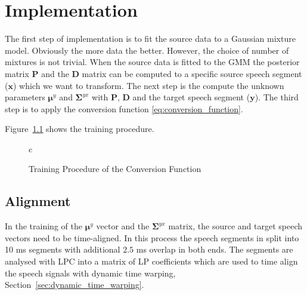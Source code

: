 \chapter{Implementation} %
\label{cha:implementation}
The first step of implementation is to fit the source data to a Gaussian mixture model. Obviously the more data the better. However, the choice of number of mixtures is not trivial. When the source data is fitted to the GMM the posterior matrix $\mathbf{P}$ and the $\mathbf{D}$ matrix can be computed to a specific source speech segment ($\mathbf{x}$) which we want to transform. The next step is the compute the unknown parameters $\boldsymbol{\mu}^y$ and $\mathbf{\Sigma}^{yx}$ with $\mathbf{P}$, $\mathbf{D}$ and the target speech segment ($\mathbf{y}$). The third step is to apply the conversion function \eqref{eq:conversion_function}.

Figure~\ref{fig:training_cf} shows the training procedure.
\begin{figure}[htbp]
  \centering
   \begin{tabular}[h]{c}
  \end{tabular}
  \caption{Training Procedure of the Conversion Function}
  \label{fig:training_cf}
\end{figure}

\section{Alignment} %
\label{sec:alignment}
In the training of the $\boldsymbol{\mu}^y$ vector and the $\mathbf{\Sigma}^{yx}$ matrix, the source and target speech vectors need to be time-aligned. In this process the speech segments in split into 10 ms segments with additional $2.5$ ms overlap in both ends. The segments are analysed with LPC into a matrix of LP coefficients which are used to time align the speech signals with dynamic time warping, Section~\ref{sec:dynamic_time_warping}.

